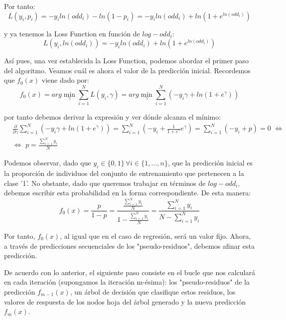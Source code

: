 \documentclass[12pt,twoside]{article}
\begin{document}
Por tanto:
\begin{equation*}
L(y_i, p_i) = -y_i ln(odd_i) - ln(1-p_i) = -y_i ln(odd_i) + ln \left( 1 + e^{ln(odd_i)} \right)
\end{equation*}

\noindent
y ya tenemos la Loss Function en función de $log-odd_i$:
\begin{equation*}
L(y_i, ln(odd_i)) = -y_i ln(odd_i) + ln \left( 1 + e^{ln(odd_i)} \right)
\end{equation*}

Así pues, una vez establecida la Loss Function, podemos abordar el primer paso del algoritmo. Veamos cuál es ahora el valor de la predicción inicial. Recordemos que $f_0(x)$ viene dado por:
\begin{equation*}
f_0(x) = arg\min_{\gamma} \sum_{i=1}^N L(y_i, \gamma) = arg\min_{\gamma} \sum_{i=1}^N \left( -y_i \gamma + ln \left( 1 + e^{\gamma} \right) \right)
\end{equation*}

\noindent
por tanto debemos derivar la expresión y ver dónde alcanza el mínimo:
\begin{equation*}
\begin{split}
& \frac{\partial}{\partial \gamma}\sum_{i=1}^N \left( -y_i \gamma + ln \left( 1 + e^{\gamma} \right) \right) = \sum_{i=1}^N \left( -y_i + \frac{1}{1 + e^{\gamma}} e^{\gamma} \right) = \sum_{i=1}^N (-y_i + p) = 0 \, \, \Leftrightarrow  \\
& \Leftrightarrow \, \, p = \frac{\sum_{i=1}^{N} y_i}{N} 
\end{split}
\end{equation*}

Podemos observar, dado que $y_i \in \{0, 1 \} \, \forall i \in \{1, \dots, n \}$, que la predicción inicial es la proporción de individuos del conjunto de entrenamiento que pertenecen a la clase '1'. No obstante, dado que queremos trabajar en términos de $log-odd_i$, debemos escribir esta probabilidad en la forma correspondiente. De esta manera:
\begin{equation*}
f_0(x) = \frac{p}{1-p} = \frac{\frac{\sum_{i=1}^{N} y_i}{N}}{1 - \frac{\sum_{i=1}^{N} y_i}{N}} = \frac{\sum_{i=1}^{N} y_i}{N -\sum_{i=1}^{N} y_i}
\end{equation*}

Por tanto, $f_0(x)$, al igual que en el caso de regresión, será un valor fijo. Ahora, a través de predicciones secuenciales de los "pseudo-residuos", debemos afinar esta predicción.

De acuerdo con lo anterior, el siguiente paso consiste en el bucle que nos calculará en cada iteración (supongamos la iteración m-ésima): los "pseudo-residuos" de la predicción $f_{m-1}(x)$, un árbol de decisión que clasifique estos residuos, los valores de respuesta de los nodos hoja del árbol generado y la nueva predicción $f_m(x)$.
\end{document}
